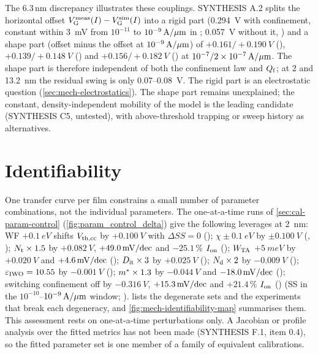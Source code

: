 The 6.3\,nm discrepancy illustrates these couplings. SYNTHESIS A.2 splits the horizontal offset $V_{\mathrm{G}}^{\mathrm{meas}}(I) - V_{\mathrm{G}}^{\mathrm{sim}}(I)$ into a rigid part (\SI{0.294}{V} with confinement, constant within \SI{3}{mV} from $10^{-11}$ to $10^{-9}\,\mathrm{A}/\mu\mathrm{m}$ in ; \SI{0.057}{V} without it, ) and a shape part (offset minus the offset at $10^{-9}\,\mathrm{A}/\mu\mathrm{m}$) of $+0.161/+\SI{0.190}{V}$ (), $+0.139/+\SI{0.148}{V}$ () and $+0.156/+\SI{0.182}{V}$ () at $10^{-7}/2\times10^{-7}\,\mathrm{A}/\mu\mathrm{m}$. The shape part is therefore independent of both the confinement law and $Q_{\mathrm{f}}$; at 2 and \SI{13.2}{nm} the residual swing is only 0.07--\SI{0.08}{V}. The rigid part is an electrostatic question (\cref{sec:mech-electrostatics}). The shape part remains unexplained; the constant, density-independent mobility of the model is the leading candidate (SYNTHESIS C5, untested), with above-threshold trapping or sweep history as alternatives.

\section{Identifiability}\label{sec:mech-identifiability}

One transfer curve per film constrains a small number of parameter combinations, not the individual parameters. The one-at-a-time runs of \cref{sec:cal-param-control} (\cref{fig:param_control_delta}) give the following leverages at \SI{2}{nm}: WF $+\SI{0.1}{eV}$ shifts $V_{\mathrm{th,cc}}$ by $+\SI{0.100}{V}$ with $\Delta\mathit{SS} = 0$ (); $\chi \pm \SI{0.1}{eV}$ by $\pm\SI{0.100}{V}$ (, ); $N_{\mathrm{t}}\times1.5$ by $+\SI{0.082}{V}$, $+49.0\,\mathrm{mV/dec}$ and $-25.1$\,\% $I_{\mathrm{on}}$ (); $W_{\mathrm{TA}}$ $+\SI{5}{meV}$ by $+\SI{0.020}{V}$ and $+4.6\,\mathrm{mV/dec}$ (); $D_{\mathrm{it}}\times3$ by $+\SI{0.025}{V}$ (); $N_{\mathrm{d}}\times2$ by $-\SI{0.009}{V}$ (); $\varepsilon_{\mathrm{IWO}} = 10.55$ by $-\SI{0.001}{V}$ (); $m^{*}\times1.3$ by $-\SI{0.044}{V}$ and $-18.0\,\mathrm{mV/dec}$ (); switching confinement off by $-\SI{0.316}{V}$, $+15.3\,\mathrm{mV/dec}$ and $+21.4$\,\% $I_{\mathrm{on}}$ () (SS in the $10^{-10}$--$10^{-9}\,\mathrm{A}/\mu\mathrm{m}$ window; ).  lists the degenerate sets and the experiments that break each degeneracy, and \cref{fig:mech-identifiability-map} summarises them. This assessment rests on one-at-a-time perturbations only. A Jacobian or profile analysis over the fitted metrics has not been made (SYNTHESIS F.1, item 0.4), so the fitted parameter set is one member of a family of equivalent calibrations.

